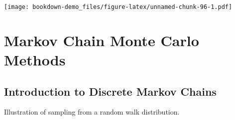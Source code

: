 \documentclass[
]{book}
\newenvironment{Shaded}{\begin{snugshade}}{\end{snugshade}}
\newcommand{\AttributeTok}[1]{\textcolor[rgb]{0.77,0.63,0.00}{#1}}
\newcommand{\ControlFlowTok}[1]{\textcolor[rgb]{0.13,0.29,0.53}{\textbf{#1}}}
\newcommand{\DecValTok}[1]{\textcolor[rgb]{0.00,0.00,0.81}{#1}}
\newcommand{\FunctionTok}[1]{\textcolor[rgb]{0.00,0.00,0.00}{#1}}
\newcommand{\NormalTok}[1]{#1}
\newcommand{\OtherTok}[1]{\textcolor[rgb]{0.56,0.35,0.01}{#1}}
\newcommand{\SpecialCharTok}[1]{\textcolor[rgb]{0.00,0.00,0.00}{#1}}
\newcommand{\StringTok}[1]{\textcolor[rgb]{0.31,0.60,0.02}{#1}}
\begin{document}
\begin{Shaded}
\end{Shaded}

\texttt{[image: bookdown-demo\_files/figure-latex/unnamed-chunk-96-1.pdf]}

\hypertarget{markov-chain-monte-carlo-methods}{%
\chapter{Markov Chain Monte Carlo Methods}\label{markov-chain-monte-carlo-methods}}

\hypertarget{introduction-to-discrete-markov-chains}{%
\section{Introduction to Discrete Markov Chains}\label{introduction-to-discrete-markov-chains}}

Illustration of sampling from a random walk distribution.
\end{document}
